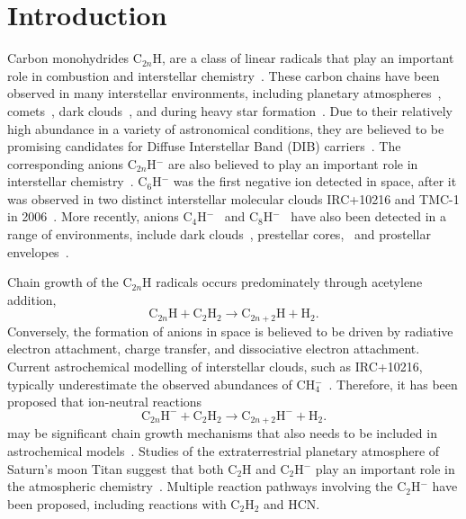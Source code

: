 \documentclass[aip,graphicx]{revtex4-1}
\begin{document}
\section{Introduction}
Carbon monohydrides C$_{2n}$H, are a class of linear radicals that play an important role in combustion and interstellar chemistry~\cite{kie90,kie92,bou96,wil91,vui01}. These carbon chains have been observed in many interstellar environments, including planetary atmospheres~\cite{vui01,wil03,dob16}, comets~\cite{jac96}, dark clouds~\cite{ziu82,gup09}, and during heavy star formation~\cite{beu08,jia15}. Due to their relatively high abundance in a variety of astronomical conditions, they are believed to be promising candidates for Diffuse Interstellar Band (DIB) carriers~\cite{dou77,ful93,wat94,ful00,sch05,gup09}. The corresponding anions C$_{2n}$H$^-$ are also believed to play an important role in interstellar chemistry~\cite{mil17,gup09}. C$_6$H$^-$ was the first negative ion detected in space, after it was observed in two distinct interstellar molecular clouds IRC+10216 and TMC-1 in 2006~\cite{mcc06}. More recently, anions C$_4$H$^-$~\cite{cer07} and C$_8$H$^-$~\cite{bru07,rem07} have also been detected in a range of environments, include dark clouds~\cite{cor13}, prestellar cores,~\cite{sak10} and prostellar envelopes~\cite{sak07}.

Chain growth of the C$_{2n}$H radicals occurs predominately through acetylene addition,~\cite{wil03}
\begin{equation}
\text{C}_{2n}\text{H} + \text{C}_2\text{H}_2 \rightarrow \text{C}_{2n+2}\text{H}+\text{H}_2.
\end{equation}
Conversely, the formation of anions in space is believed to be driven by radiative electron attachment, charge transfer, and dissociative electron attachment. Current astrochemical modelling of interstellar clouds, such as IRC+10216, typically underestimate the observed abundances of CH$_4^-$~\cite{mil17,cor13,her08}. Therefore, it has been proposed that ion-neutral reactions
\begin{equation}
\text{C}_{2n}\text{H}^- + \text{C}_2\text{H}_2 \rightarrow \text{C}_{2n+2}\text{H}^- + \text{H}_2.
\end{equation}
may be significant chain growth mechanisms that also needs to be included in astrochemical models~\cite{mil17,bas19}. Studies of the extraterrestrial planetary atmosphere of Saturn's moon Titan suggest that both C$_2$H and C$_2$H$^-$ play an important role in the atmospheric chemistry~\cite{dob16,vui09,des17,vri18}. Multiple reaction pathways involving the C$_2$H$^-$ have been proposed, including reactions with C$_2$H$_2$ and HCN. 
\end{document}
